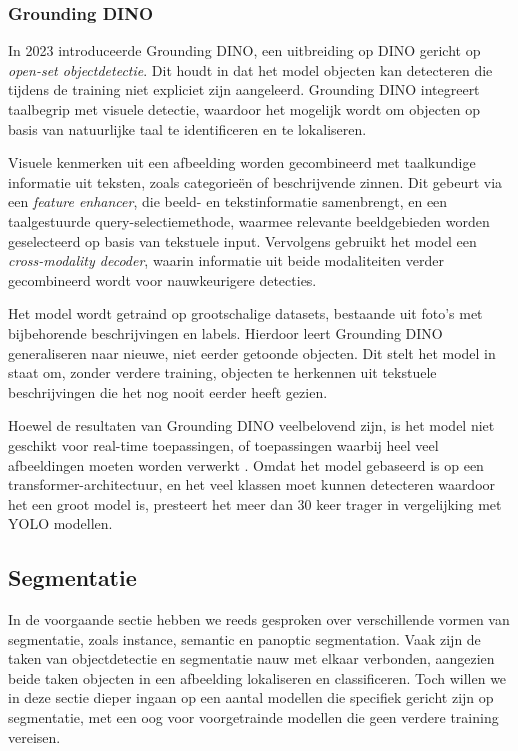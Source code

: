 \subsubsection{Grounding DINO}

In 2023 introduceerde \textcite{Liu2023} Grounding DINO, een uitbreiding op DINO gericht op \textit{open-set objectdetectie}. Dit houdt in dat het model objecten kan detecteren die tijdens de training niet expliciet zijn aangeleerd. 
Grounding DINO integreert taalbegrip met visuele detectie, waardoor het mogelijk wordt om objecten op basis van natuurlijke taal te identificeren en te lokaliseren.

Visuele kenmerken uit een afbeelding worden gecombineerd met taalkundige informatie uit teksten, zoals categorieën of beschrijvende zinnen. 
Dit gebeurt via een \textit{feature enhancer}, die beeld- en tekstinformatie samenbrengt, en een taalgestuurde query-selectiemethode, waarmee relevante beeldgebieden worden geselecteerd op basis van tekstuele input. 
Vervolgens gebruikt het model een \textit{cross-modality decoder}, waarin informatie uit beide modaliteiten verder gecombineerd wordt voor nauwkeurigere detecties.

Het model wordt getraind op grootschalige datasets, bestaande uit foto's met bijbehorende beschrijvingen en labels. 
Hierdoor leert Grounding DINO generaliseren naar nieuwe, niet eerder getoonde objecten. Dit stelt het model in staat om, zonder verdere training, objecten te herkennen uit tekstuele beschrijvingen die het nog nooit eerder heeft gezien.

Hoewel de resultaten van Grounding DINO veelbelovend zijn, is het model niet geschikt voor real-time toepassingen, of toepassingen waarbij heel veel afbeeldingen moeten worden verwerkt \autocite{Son2024}.
Omdat het model gebaseerd is op een transformer-architectuur, en het veel klassen moet kunnen detecteren waardoor het een groot model is, presteert het meer dan 30 keer trager in vergelijking met YOLO modellen.

\subsection{Segmentatie}

In de voorgaande sectie hebben we reeds gesproken over verschillende vormen van segmentatie, zoals instance, semantic en panoptic segmentation.
Vaak zijn de taken van objectdetectie en segmentatie nauw met elkaar verbonden, aangezien beide taken objecten in een afbeelding lokaliseren en classificeren.
Toch willen we in deze sectie dieper ingaan op een aantal modellen die specifiek gericht zijn op segmentatie, met een oog voor voorgetrainde modellen die geen verdere training vereisen.

